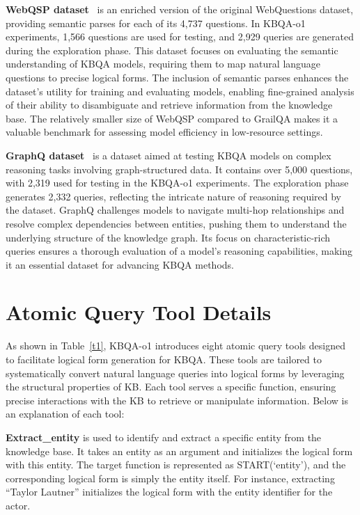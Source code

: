 \documentclass{article}
\theoremstyle{plain}
\theoremstyle{definition}
\theoremstyle{remark}
\begin{document}
\textbf{WebQSP dataset}~\citep{WebQSP} is an enriched version of the original WebQuestions dataset, providing semantic parses for each of its 4,737 questions. In KBQA-o1 experiments, 1,566 questions are used for testing, and 2,929 queries are generated during the exploration phase. This dataset focuses on evaluating the semantic understanding of KBQA models, requiring them to map natural language questions to precise logical forms. The inclusion of semantic parses enhances the dataset’s utility for training and evaluating models, enabling fine-grained analysis of their ability to disambiguate and retrieve information from the knowledge base. The relatively smaller size of WebQSP compared to GrailQA makes it a valuable benchmark for assessing model efficiency in low-resource settings.

\textbf{GraphQ dataset}~\citep{GraphQ} is a dataset aimed at testing KBQA models on complex reasoning tasks involving graph-structured data. It contains over 5,000 questions, with 2,319 used for testing in the KBQA-o1 experiments. The exploration phase generates 2,332 queries, reflecting the intricate nature of reasoning required by the dataset. GraphQ challenges models to navigate multi-hop relationships and resolve complex dependencies between entities, pushing them to understand the underlying structure of the knowledge graph. Its focus on characteristic-rich queries ensures a thorough evaluation of a model’s reasoning capabilities, making it an essential dataset for advancing KBQA methods.

\section{Atomic Query Tool Details}
As shown in Table~\ref{t1}, KBQA-o1 introduces eight atomic query tools designed to facilitate logical form generation for KBQA. These tools are tailored to systematically convert natural language queries into logical forms by leveraging the structural properties of KB. Each tool serves a specific function, ensuring precise interactions with the KB to retrieve or manipulate information. Below is an explanation of each tool:

\textbf{Extract\_entity} is used to identify and extract a specific entity from the knowledge base. It takes an entity as an argument and initializes the logical form with this entity. The target function is represented as START(`entity'), and the corresponding logical form is simply the entity itself. For instance, extracting ``Taylor Lautner” initializes the logical form with the entity identifier for the actor.
\end{document}
